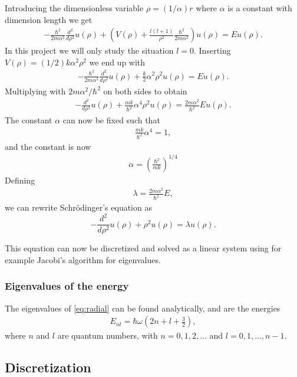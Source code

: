 \documentclass[11pt,a4paper,english,draft]{article}
\numberwithin{equation}{section}
\begin{document}
Introducing the dimensionless variable $\rho = (1/\alpha) r$
where $\alpha$ is a constant with dimension length we get
\begin{gather}
  -\frac{\hbar^2}{2 m \alpha^2} \frac{d^2}{d\rho^2} u(\rho) 
       + \left ( V(\rho) + \frac{l (l + 1)}{\rho^2}
         \frac{\hbar^2}{2 m\alpha^2} \right ) u(\rho)  = E u(\rho) .
\end{gather}
In this project we will only study the situation $l=0$.
Inserting $V(\rho) = (1/2) k \alpha^2\rho^2$ we end up with
\begin{gather}
  -\frac{\hbar^2}{2 m \alpha^2} \frac{d^2}{d\rho^2} u(\rho) 
       + \frac{k}{2} \alpha^2\rho^2u(\rho)  = E u(\rho) .
\end{gather}
Multiplying with $2m\alpha^2/\hbar^2$ on both sides to obtain
\begin{gather}
  -\frac{d^2}{d\rho^2} u(\rho) 
       + \frac{mk}{\hbar^2} \alpha^4\rho^2u(\rho) 
       = \frac{2m\alpha^2}{\hbar^2}E u(\rho) .
\end{gather}
The constant $\alpha$ can now be fixed such that
\begin{gather}
\frac{mk}{\hbar^2} \alpha^4 = 1,
\end{gather}
and the constant is now
\begin{gather}
\alpha = \left(\frac{\hbar^2}{mk}\right)^{1/4}
\end{gather}
Defining 
\begin{gather}
\lambda = \frac{2m\alpha^2}{\hbar^2}E,
\end{gather}
we can rewrite Schrödinger's equation as
\begin{equation}
  -\frac{d^2}{d\rho^2} u(\rho) + \rho^2u(\rho)  = \lambda u(\rho) .
\end{equation}

This equation can now be discretized and solved as a linear system 
using for example Jacobi's algorithm for eigenvalues. 

\subsubsection{Eigenvalues of the energy}
The eigenvalues of \eqref{eq:radial} can be found analytically,
and are the energies
\begin{gather}
E_{nl}=  \hbar \omega \left(2n+l+\frac{3}{2}\right),
\end{gather}
where $n$ and $l$ are quantum numbers, with $n = 0, 1, 2, \dots$ and
$l = 0, 1, \dots, n-1$.
 
 
\subsection{Discretization}
\end{document}
